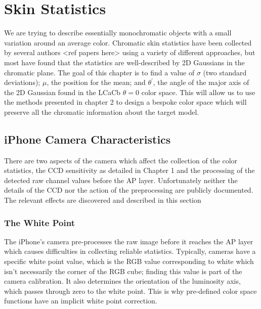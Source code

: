 
\chapter{Skin Statistics}\label{sec:ChapSkin}
\ifpdf
    \graphicspath{{Chapter3/Figs/Raster/}{Chapter3/Figs/PDF/}{Chapter3/Figs/}}
\else
    \graphicspath{{Chapter3/Figs/Vector/}{Chapter3/Figs/}}
\fi

We are trying to describe essentially monochromatic objects with a small variation around an average color. Chromatic skin statistics have been collected by several authors <ref papers here> using a variety of different approaches, but most have found that the statistics are well-described by 2D Gaussians in the chromatic plane. The goal of this chapter is to find a value of $\sigma$ (two standard deviations); $\mu$, the position for the mean; and $\theta^\prime$, the angle of the major axis of the 2D Gaussian found in the LCaCb $\theta = 0$ color space. This will allow us to use the methods presented in chapter 2 to design a bespoke color space which will preserve all the chromatic information about the target model.

\section{iPhone Camera Characteristics} \label{sec:iPhoneCameraCharacteristics}
There are two aspects of the camera which affect the collection of the color statistics, the CCD sensitivity as detailed in Chapter 1 and the processing of the detected raw channel values before the AP layer. Unfortunately neither the details of the CCD nor the action of the preprocessing are publicly documented. The relevant effects are discovered and described in this section 

\subsection{The White Point}
The iPhone's camera pre-processes the raw image before it reaches the AP layer which causes difficulties in collecting reliable statistics. Typically, cameras have a specific white point value, which is the RGB value corresponding to white which isn't necessarily the corner of the RGB cube; finding this value is part of the camera calibration. It also determines the orientation of the luminosity axis, which passes through zero to the white point. This is why pre-defined color space functions have an implicit white point correction. 


